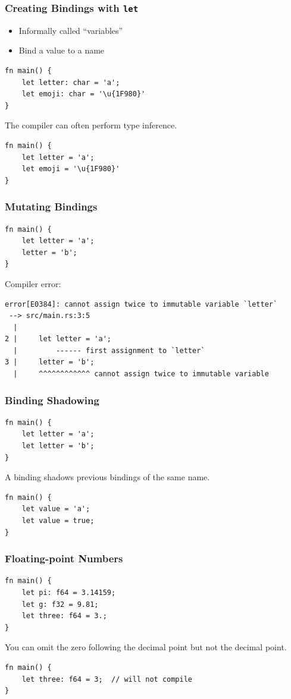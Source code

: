 \documentclass[aspectratio=169]{beamer}
\begin{document}
\begin{frame}[fragile]
    \frametitle{Creating Bindings with \texttt{let}}
    \begin{itemize}
        \item Informally called ``variables''
        \item Bind a value to a name
    \end{itemize}
    \pause
    \begin{verbatim}
fn main() {
    let letter: char = 'a';
    let emoji: char = '\u{1F980}'
}
    \end{verbatim}
    \pause
    The compiler can often perform type inference.
    \pause
    \begin{verbatim}
fn main() {
    let letter = 'a';
    let emoji = '\u{1F980}'
}
    \end{verbatim}
\end{frame}

\begin{frame}[fragile]
    \frametitle{Mutating Bindings}
    \begin{verbatim}
fn main() {
    let letter = 'a';
    letter = 'b';
}
    \end{verbatim}
    \pause
    Compiler error:
    \begin{verbatim}
error[E0384]: cannot assign twice to immutable variable `letter`
 --> src/main.rs:3:5
  |
2 |     let letter = 'a';
  |         ------ first assignment to `letter`
3 |     letter = 'b';
  |     ^^^^^^^^^^^^ cannot assign twice to immutable variable
    \end{verbatim}
\end{frame}

\begin{frame}[fragile]
    \frametitle{Binding Shadowing}
    \begin{verbatim}
fn main() {
    let letter = 'a';
    let letter = 'b';
}
    \end{verbatim}
    \pause
    A binding shadows previous bindings of the same name.
    \pause
    \begin{verbatim}
fn main() {
    let value = 'a';
    let value = true;
}
    \end{verbatim}
\end{frame}

\begin{frame}[fragile]
    \frametitle{Floating-point Numbers}
    \begin{verbatim}
fn main() {
    let pi: f64 = 3.14159;
    let g: f32 = 9.81;
    let three: f64 = 3.;
}
    \end{verbatim}
    \pause
    You can omit the zero following the decimal point but not the decimal point.
    \pause
    \begin{verbatim}
fn main() {
    let three: f64 = 3;  // will not compile
}
    \end{verbatim}
\end{frame}
\end{document}

